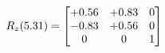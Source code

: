 \documentclass[preview]{standalone}
\begin{document}
\begin{align*}
\special{dvisvgm:raw <g id='unique000'>}R_{z}(5.31) = \begin{bmatrix}+0.56 & +0.83 & 0 \\-0.83 & +0.56 & 0 \\0 & 0 & 1\end{bmatrix}\special{dvisvgm:raw </g>}
\end{align*}
\end{document}
